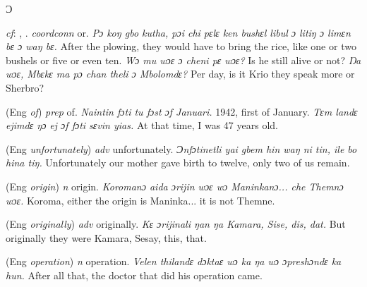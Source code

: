 \begin{letter}{Ɔ}

 \textit{cf}: , . \textit{coordconn} or. \textit{Pɔ koŋ gbo kutha, pɔi chi pɛlɛ ken bushɛl libul ɔ litiŋ ɔ limɛn bɛ ɔ waŋ bɛ.} After the plowing, they would have to bring the rice, like one or two bushels or five or even ten. \textit{Wɔ mu wɔɛ ɔ cheni pɛ wɔɛ?} Is he still alive or not? \textit{Ŋa wɔɛ, Mbɛkɛ ma pɔ chan theli ɔ Mbolomdɛ?} Per day, is it Krio they speak more or Sherbro?

 (Eng \textit{of}) \textit{prep} of. \textit{Naintin fɔti tu fɔst ɔf Januari.} 1942, first of January. \textit{Tɛm landɛ ejimdɛ ŋɔ ej ɔf fɔti sɛvin yias.} At that time, I was 47 years old.

 (Eng \textit{unfortunately}) \textit{adv} unfortunately. \textit{Ɔnfɔtinetli yai gbem hin waŋ ni tin, ile bo hina tiŋ.} Unfortunately our mother gave birth to twelve, only two of us remain.

 (Eng \textit{origin}) \textit{n} origin. \textit{Koromanɔ aida ɔrijin wɔɛ wɔ Maninkanɔ... che Themnɔ wɔɛ.} Koroma, either the origin is Maninka... it is not Themne. 

 (Eng \textit{originally}) \textit{adv} originally. \textit{Kɛ ɔrijinali ŋan ŋa Kamara, Sise, dis, dat.} But originally they were Kamara, Sesay, this, that.

 (Eng \textit{operation}) \textit{n} operation. \textit{Velen thilandɛ dɔktaɛ wɔ ka ŋa wɔ ɔpreshɔndɛ ka hun.} After all that, the doctor that did his operation came.

\end{letter}
